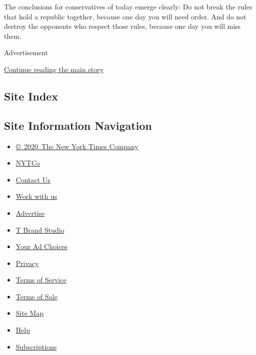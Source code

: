 The conclusions for conservatives of today emerge clearly: Do not break
the rules that hold a republic together, because one day you will need
order. And do not destroy the opponents who respect those rules, because
one day you will miss them.

Advertisement

\protect\hyperlink{after-bottom}{Continue reading the main story}

\hypertarget{site-index}{%
\subsection{Site Index}\label{site-index}}

\hypertarget{site-information-navigation}{%
\subsection{Site Information
Navigation}\label{site-information-navigation}}

\begin{itemize}
\tightlist
\item
  \href{https://help.nytimes3xbfgragh.onion/hc/en-us/articles/115014792127-Copyright-notice}{©~2020~The
  New York Times Company}
\end{itemize}

\begin{itemize}
\tightlist
\item
  \href{https://www.nytco.com/}{NYTCo}
\item
  \href{https://help.nytimes3xbfgragh.onion/hc/en-us/articles/115015385887-Contact-Us}{Contact
  Us}
\item
  \href{https://www.nytco.com/careers/}{Work with us}
\item
  \href{https://nytmediakit.com/}{Advertise}
\item
  \href{http://www.tbrandstudio.com/}{T Brand Studio}
\item
  \href{https://www.nytimes3xbfgragh.onion/privacy/cookie-policy\#how-do-i-manage-trackers}{Your
  Ad Choices}
\item
  \href{https://www.nytimes3xbfgragh.onion/privacy}{Privacy}
\item
  \href{https://help.nytimes3xbfgragh.onion/hc/en-us/articles/115014893428-Terms-of-service}{Terms
  of Service}
\item
  \href{https://help.nytimes3xbfgragh.onion/hc/en-us/articles/115014893968-Terms-of-sale}{Terms
  of Sale}
\item
  \href{https://spiderbites.nytimes3xbfgragh.onion}{Site Map}
\item
  \href{https://help.nytimes3xbfgragh.onion/hc/en-us}{Help}
\item
  \href{https://www.nytimes3xbfgragh.onion/subscription?campaignId=37WXW}{Subscriptions}
\end{itemize}
